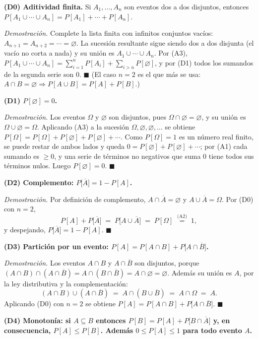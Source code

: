 \documentclass[11pt]{article}
\begin{document}
\begin{teo}
\medskip
\textbf{(D0) Aditividad finita.} Si $A_1,\dots,A_n$ son eventos dos a dos disjuntos, entonces
$P[A_1\cup\cdots\cup A_n]=P[A_1]+\cdots+P[A_n]$.

\emph{Demostración.} Complete la lista finita con infinitos conjuntos vacíos:
$A_{n+1}=A_{n+2}=\cdots=\varnothing$. La sucesión resultante sigue siendo dos a dos disjunta
(el vacío no corta a nada) y su unión es $A_1\cup\cdots\cup A_n$. Por (A3),
$P[A_1\cup\cdots\cup A_n]=\sum_{i=1}^{n}P[A_i]+\sum_{i>n}P[\varnothing]$, y por (D1) todos los
sumandos de la segunda serie son $0$. $\blacksquare$
(El caso $n=2$ es el que más se usa: $A\cap B=\varnothing \Rightarrow P[A\cup B]=P[A]+P[B]$.)

\medskip
\textbf{(D1) $P[\varnothing]=0$.}

\emph{Demostración.} Los eventos $\Omega$ y $\varnothing$ son disjuntos, pues
$\Omega\cap\varnothing=\varnothing$, y su unión es $\Omega\cup\varnothing=\Omega$. Aplicando
(A3) a la sucesión $\Omega,\varnothing,\varnothing,\dots$ se obtiene
$P[\Omega]=P[\Omega]+P[\varnothing]+P[\varnothing]+\cdots$. Como $P[\Omega]=1$ es un número
real finito, se puede restar de ambos lados y queda
$0=P[\varnothing]+P[\varnothing]+\cdots$; por (A1) cada sumando es $\ge 0$, y una serie de
términos no negativos que suma $0$ tiene todos sus términos nulos. Luego
$P[\varnothing]=0$. $\blacksquare$

\medskip
\textbf{(D2) Complemento: $P\big[\overline{A}\big]=1-P[A]$.}

\emph{Demostración.} Por definición de complemento, $A\cap\overline{A}=\varnothing$ y
$A\cup\overline{A}=\Omega$. Por (D0) con $n=2$,
\[
P[A]+P\big[\overline{A}\big] \;=\; P\big[A\cup\overline{A}\big] \;=\; P[\Omega]
\;\overset{\text{(A2)}}{=}\; 1 ,
\]
y despejando, $P\big[\overline{A}\big]=1-P[A]$. $\blacksquare$

\medskip
\textbf{(D3) Partición por un evento: $P[A]=P[A\cap B]+P\big[A\cap\overline{B}\big]$.}

\emph{Demostración.} Los eventos $A\cap B$ y $A\cap\overline{B}$ son disjuntos, porque
$(A\cap B)\cap(A\cap\overline{B})=A\cap(B\cap\overline{B})=A\cap\varnothing=\varnothing$.
Además su unión es $A$, por la ley distributiva y la complementación:
\[
(A\cap B)\cup(A\cap\overline{B}) \;=\; A\cap(B\cup\overline{B}) \;=\; A\cap\Omega \;=\; A .
\]
Aplicando (D0) con $n=2$ se obtiene $P[A]=P[A\cap B]+P\big[A\cap\overline{B}\big]$. $\blacksquare$

\medskip
\textbf{(D4) Monotonía: si $A\subseteq B$ entonces $P[B]=P[A]+P\big[B\cap\overline{A}\big]$ y,
en consecuencia, $P[A]\le P[B]$. Además $0\le P[A]\le 1$ para todo evento $A$.}


\end{teo}
\end{document}
